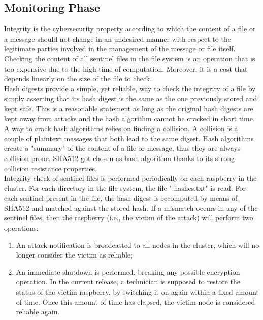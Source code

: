 \subsection{Monitoring Phase}

Integrity is the cybersecurity property according to which the content of a file or a message should not change in an undesired manner with respect to the legitimate parties involved in the management of the message or file itself.\\
Checking the content of all sentinel files in the file system is an operation that is too expensive due to the high time of computation. Moreover, it is a cost that depends linearly on the size of the file to check.\\
Hash digests provide a simple, yet reliable, way to check the integrity of a file by simply asserting that its hash digest is the same as the one previously stored and kept safe. This is a reasonable statement as long as the original hash digests are kept away from attacks and the hash algorithm cannot be cracked in short time. A way to crack hash algorithms relies on finding a collision. A collision is a couple of plaintext messages that both lead to the same digest. Hash algorithms create a "summary" of the content of a file or message, thus they are always collision prone. SHA512 got chosen as hash algorithm thanks to its strong collision resistance properties.\\  
Integrity check of sentinel files is performed periodically on each raspberry in the cluster. For each directory in the file system, the file ".hashes.txt" is read. For each sentinel present in the file, the hash digest is recomputed by means of SHA512 and matched against the stored hash. If a mismatch occurs in any of the sentinel files, then the raspberry (i.e., the victim of the attack) will perform two operations:

\begin{enumerate}
  \item An attack notification is broadcasted to all nodes in the cluster, which will no longer consider the victim as reliable;
  \item An immediate shutdown is performed, breaking any possible encryption operation. In the current release, a technician is supposed to restore the status of the victim raspberry, by switching it on again within a fixed amount of time. Once this amount of time has elapsed, the victim node is considered reliable again.
\end{enumerate}


